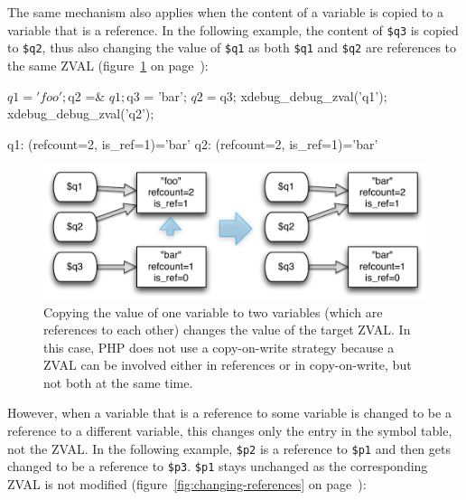 The same mechanism also applies when the content of a variable is copied to a variable that is a reference. In the following example, the content of \texttt{\$q3} is copied to \texttt{\$q2}, thus also changing the value of \texttt{\$q1} as both \texttt{\$q1} and \texttt{\$q2} are references to the same ZVAL (figure~\ref{fig:copying-value-to-reference} on page~\pageref{fig:copying-value-to-reference}):

\begin{phpcode}
$q1 = 'foo';
$q2 =& $q1;

$q3 = 'bar';
$q2 = $q3;
xdebug_debug_zval('q1');
xdebug_debug_zval('q2');
\end{phpcode}

\begin{textcode}
q1: (refcount=2, is_ref=1)='bar'
q2: (refcount=2, is_ref=1)='bar'
\end{textcode}

\begin{figure}[htb]
  \begin{center}
    \includegraphics[scale=0.8]{images/q1_q2_q3}
    \caption{Copying the value of one variable to two variables (which are references to each other) changes the value of the target ZVAL. In this case, PHP does not use a copy-on-write strategy because a ZVAL can be involved either in references or in copy-on-write, but not both at the same time.}
    \label{fig:copying-value-to-reference}
  \end{center}
\end{figure}



However, when a variable that is a reference to some variable is changed to be a reference to a different variable, this changes only the entry in the symbol table, not the ZVAL. In the following example, \texttt{\$p2} is a reference to \texttt{\$p1} and then gets changed to be a reference to \texttt{\$p3}. \texttt{\$p1} stays unchanged as the corresponding ZVAL is not modified (figure~\ref{fig:changing-references} on page~\pageref{fig:changing-references}):

